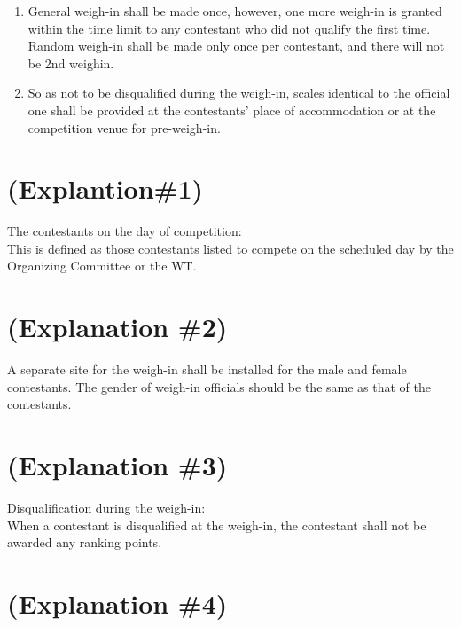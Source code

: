 \documentclass[
]{report}
\providecommand{\tightlist}{%
  \setlength{\itemsep}{0pt}\setlength{\parskip}{0pt}}
\begin{document}
\begin{enumerate}
  \begin{enumerate}
  \tightlist
  \item
    Cadet and junior contestant must be weighed with underwear(s) and
    100 grams will be allowed to compensate.
  \end{enumerate}
\item
  General weigh-in shall be made once, however, one more weigh-in is
  granted within the time limit to any contestant who did not qualify
  the first time. Random weigh-in shall be made only once per
  contestant, and there will not be 2nd weighin.
\item
  So as not to be disqualified during the weigh-in, scales identical to
  the official one shall be provided at the contestants' place of
  accommodation or at the competition venue for pre-weigh-in.
\end{enumerate}

\section{(Explantion\#1)}\label{explantion1}

The contestants on the day of competition:\\
This is defined as those contestants listed to compete on the scheduled
day by the Organizing Committee or the WT.

\section{(Explanation \#2)}\label{explanation-2-2}

A separate site for the weigh-in shall be installed for the male and
female contestants. The gender of weigh-in officials should be the same
as that of the contestants.

\section{(Explanation \#3)}\label{explanation-3-2}

Disqualification during the weigh-in:\\
When a contestant is disqualified at the weigh-in, the contestant shall
not be awarded any ranking points.

\section{(Explanation \#4)}\label{explanation-4-1}
\end{document}
